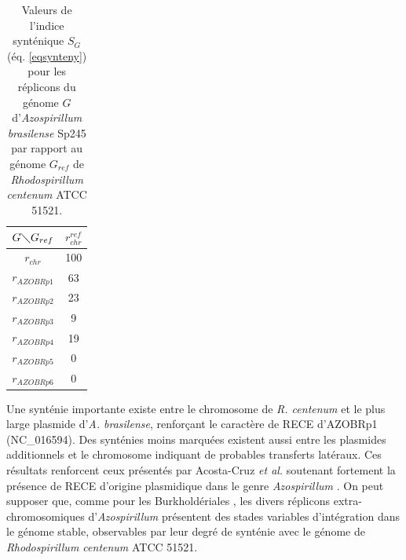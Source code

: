 \begin{table}[H]
\caption[Valeurs de l'indice synténique pour \textit{Azospirillum}]{Valeurs de l'indice synténique $S_{G}$ (éq. \ref{eqsynteny}) pour les réplicons du génome $G$ d'\textit{Azospirillum brasilense} Sp245 par rapport au génome $G_{ref}$ de \textit{Rhodospirillum centenum} ATCC 51521.}\label{tablesyntazo}
\begin{center}
	\begin{tabular}{c|c}
		$G \diagdown G_{ref}$ & $r^{ref}_{chr}$\\
		\hline
		$r_{chr}$ & 100\\
		$r_{AZOBRp1}$ & 63\\
		$r_{AZOBRp2}$ & 23\\
		$r_{AZOBRp3}$ & 9\\
		$r_{AZOBRp4}$ & 19\\
		 $r_{AZOBRp5}$ & 0\\
		$r_{AZOBRp6}$ & 0\\ 
	\end{tabular}
\end{center}
\end{table}  

Une synténie importante existe entre le chromosome de \textit{R. centenum} et le plus large plasmide d'\textit{A. brasilense}, renforçant le caractère de RECE d'AZOBRp1 (NC\_016594). Des synténies moins marquées existent aussi entre les plasmides additionnels et le chromosome indiquant de probables transferts latéraux. Ces résultats renforcent ceux présentés par Acosta-Cruz \textit{et al.} soutenant fortement la présence de RECE d'origine plasmidique dans le genre \textit{Azospirillum} \citep{Acosta-Cruz2012}. On peut supposer que, comme pour les Burkholdériales \citep{Passot2012}, les divers réplicons extra-chromosomiques d'\textit{Azospirillum} présentent des stades variables d'intégration dans le génome stable, observables par leur degré de synténie avec le génome de \textit{Rhodospirillum centenum} ATCC 51521.
    


